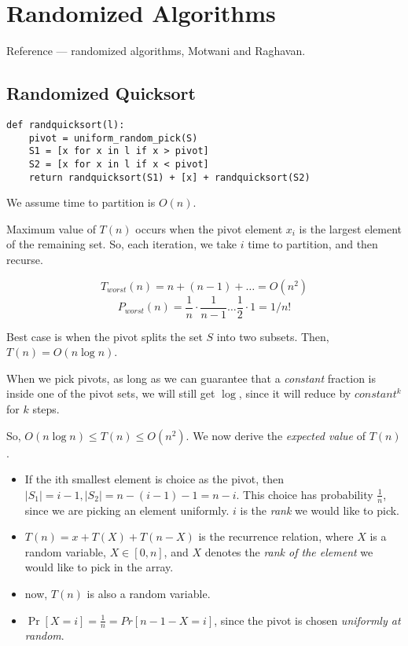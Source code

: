 \chapter{Randomized Algorithms}
Reference --- randomized algorithms, Motwani and Raghavan.

\newcommand{\E}[1]{\mathbb{E}\big[ #1 \big]}

\section{Randomized Quicksort}

\begin{verbatim}
def randquicksort(l):
	pivot = uniform_random_pick(S)
	S1 = [x for x in l if x > pivot]
	S2 = [x for x in l if x < pivot]
	return randquicksort(S1) + [x] + randquicksort(S2)
\end{verbatim}
We assume time to partition is $O(n)$.

Maximum value of $T(n)$ occurs when the pivot element $x_i$ is
the largest element of the remaining set. So, each iteration, we take $i$ time
to partition, and then recurse.

$$T_{worst}(n) = n + (n - 1) + \dots = O(n^2)$$
$$P_{worst}(n) = \frac{1}{n} \cdot \frac{1}{n - 1} \dots \frac{1}{2} \cdot 1 = 1/n!$$

Best case is when the pivot splits the set $S$ into two subsets.
Then, $T(n) = O(n \log n)$.

When we pick pivots, as long as we can guarantee that a \textit{constant} fraction
is inside one of the pivot sets, we will still get $\log$, since it will reduce by $constant^k$ for $k$ steps.

So, $O(n \log n) \leq T(n) \leq O(n^2)$. We now derive the \textit{expected value} of $T(n)$.

\begin{itemize}
\item  If the ith smallest element is choice as the pivot, then $|S_1| = i - 1, |S_2| = n - (i - 1) - 1 = n - i$. This choice
has probability $\frac{1}{n}$, since we are picking an element uniformly. $i$ is the \textit{rank} we would like to pick.

\item $T(n) = x + T(X) + T(n - X)$ is the recurrence relation, where $X$ is a random variable, $X \in [0, n]$, and $X$
denotes the \textit{rank of the element} we would like to pick in the array.

\item now, $T(n)$ is also a random variable.

\item $\Pr[X = i] = \frac{1}{n} = Pr[n - 1 - X = i]$, since the pivot is chosen \textit{uniformly at random}.
\end{itemize}

